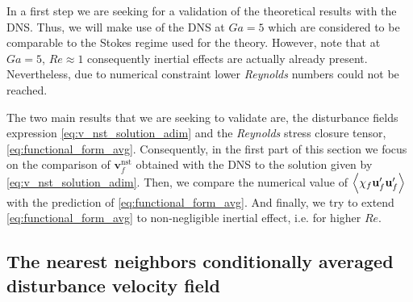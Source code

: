 In a first step we are seeking for a validation of the theoretical results with the DNS. 
Thus, we will make use of the DNS at $Ga = 5$ which are considered to be comparable to the Stokes regime used for the theory. 
However, note that at $Ga = 5$, $Re \approx 1$ consequently inertial effects are actually already present. 
Nevertheless, due to numerical constraint lower \textit{Reynolds} numbers could not be reached. 

The two main results that we are seeking to validate are, the disturbance fields expression \eqref{eq:v_nst_solution_adim} and the \textit{Reynolds} stress closure tensor, \eqref{eq:functional_form_avg}. 
Consequently, in the first part of this section we focus on the comparison of $\textbf{v}_f^\text{nst}$ obtained with the DNS to the solution given by \ref{eq:v_nst_solution_adim}.
Then, we compare the numerical value of $\left<\chi_f \textbf{u}_f'\textbf{u}_f'\right>$ with the prediction of \ref{eq:functional_form_avg}. 
And finally, we try to extend \ref{eq:functional_form_avg} to non-negligible inertial effect, i.e. for higher $Re$. 

\subsection{The nearest neighbors conditionally averaged disturbance velocity field}


